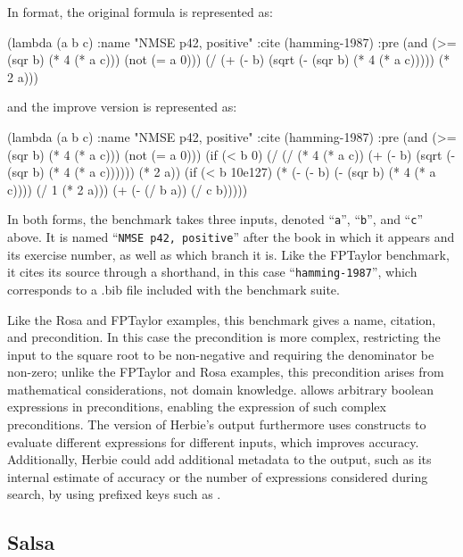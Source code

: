 \documentclass[main.tex]{subfiles}
\begin{document}
\noindent In \core format, the original formula is represented as:

\begin{code}
(lambda (a b c)
  :name "NMSE p42, positive"
  :cite (hamming-1987)
  :pre (and (>= (sqr b) (* 4 (* a c))) (not (= a 0)))
  (/ (+ (- b) (sqrt (- (sqr b) (* 4 (* a c))))) (* 2 a)))
\end{code}

\noindent and the improve version is represented as:

\begin{code}
(lambda (a b c)
  :name "NMSE p42, positive"
  :cite (hamming-1987)
  :pre (and (>= (sqr b) (* 4 (* a c))) (not (= a 0)))
  (if (< b 0)
      (/ (/ (* 4 (* a c)) (+ (- b) (sqrt (- (sqr b) (* 4 (* a c)))))) (* 2 a))
      (if (< b 10e127)
          (* (- (- b) (- (sqr b) (* 4 (* a c)))) (/ 1 (* 2 a)))
          (+ (- (/ b a)) (/ c b)))))
\end{code}

In both forms, the benchmark takes three inputs, denoted
``\verb|a|'', ``\verb|b|'', and ``\verb|c|'' above. It is named
``\verb|NMSE p42, positive|'' after the book in which it appears and
its exercise number, as well as which branch it is. Like the FPTaylor
benchmark, it cites its source through a shorthand, in this case
``\verb|hamming-1987|'', which corresponds to a .bib file included
with the benchmark suite.

Like the Rosa and FPTaylor examples,
  this benchmark gives a name, citation, and precondition.
In this case the precondition is more complex,
  restricting the input to the square root to be non-negative
  and requiring the denominator be non-zero;
  unlike the FPTaylor and Rosa examples,
  this precondition arises from mathematical considerations,
  not domain knowledge.
\core allows arbitrary boolean expressions in preconditions,
  enabling the expression of such complex preconditions.
The \core version of Herbie's output
  furthermore uses  constructs to evaluate
  different expressions for different inputs,
  which improves accuracy.
Additionally, Herbie could add additional metadata to the output,
  such as its internal estimate of accuracy
  or the number of expressions considered during search,
  by using prefixed keys such as .

\subsection{Salsa}
\end{document}
